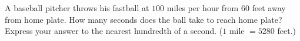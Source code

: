 A baseball pitcher throws his fastball at $100$ miles per hour from $60$ feet away from home plate. How many seconds does the ball take to reach home plate? Express your answer to the nearest hundredth of a second. ($1$ mile $=5280$ feet.)
